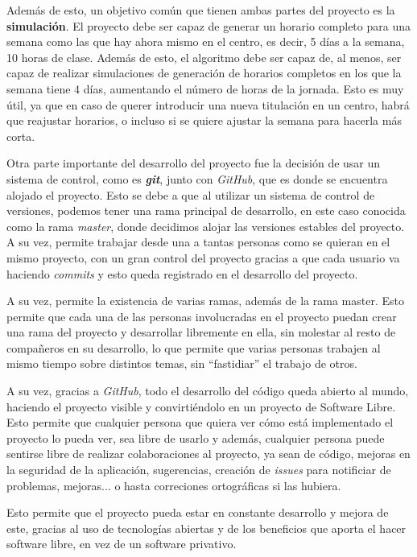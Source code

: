 Además de esto, un objetivo común que tienen ambas partes del proyecto es la \textbf{simulación}. El proyecto debe ser capaz de generar un horario completo para una semana como las que hay ahora mismo en el centro, es decir, 5 días a la semana, 10 horas de clase. Además de esto, el algoritmo debe ser capaz de, al menos, ser capaz de realizar simulaciones de generación de horarios completos en los que la semana tiene 4 días, aumentando el número de horas de la jornada. Esto es muy útil, ya que en caso de querer introducir una nueva titulación en un centro, habrá que reajustar horarios, o incluso si se quiere ajustar la semana para hacerla más corta.

Otra parte importante del desarrollo del proyecto fue la decisión de usar un sistema de control, como es \textbf{\textit{git}}, junto con \textit{GitHub}, que es donde se encuentra alojado el proyecto. Esto se debe a que al utilizar un sistema de control de versiones, podemos tener una rama principal de desarrollo, en este caso conocida como la rama \textit{master}, donde decidimos alojar las versiones estables del proyecto. A su vez, permite trabajar desde una a tantas personas como se quieran en el mismo proyecto, con un gran control del proyecto gracias a que cada usuario va haciendo \textit{commits} y esto queda registrado en el desarrollo del proyecto.

A su vez, permite la existencia de varias ramas, además de la rama master. Esto permite que cada una de las personas involucradas en el proyecto puedan crear una rama del proyecto y desarrollar libremente en ella, sin molestar al resto de compañeros en su desarrollo, lo que permite que varias personas trabajen al mismo tiempo sobre distintos temas, sin ``fastidiar'' el trabajo de otros.

A su vez, gracias a \textit{GitHub}, todo el desarrollo del código queda abierto al mundo, haciendo el proyecto visible y convirtiéndolo en un proyecto de Software Libre. Esto permite que cualquier persona que quiera ver cómo está implementado el proyecto lo pueda ver, sea libre de usarlo y además, cualquier persona puede sentirse libre de realizar colaboraciones al proyecto, ya sean de código, mejoras en la seguridad de la aplicación, sugerencias, creación de \textit{issues} para notificiar de problemas, mejoras... o hasta correciones ortográficas si las hubiera.

Esto permite que el proyecto pueda estar en constante desarrollo y mejora de este, gracias al uso de tecnologías abiertas y de los beneficios que aporta el hacer software libre, en vez de un software privativo.
